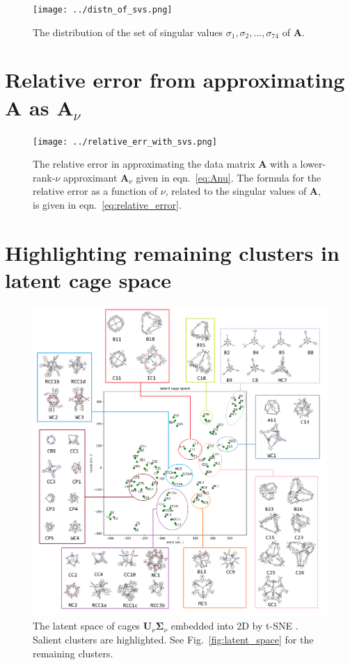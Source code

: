 \documentclass[journal=jacsat,manuscript=article]{achemso}
\begin{document}
\begin{figure}
\centering
	\texttt{[image: ../distn\_of\_svs.png]}
	\caption{The distribution of the set of singular values $\sigma_1,\sigma_2, ..., \sigma_{74}$ of $\mathbf{A}$.
	} \label{fig:distn_of_svs}
\end{figure}

\newpage
\clearpage

\section{Relative error from approximating $\mathbf{A}$ as $\mathbf{A}_\nu$}

\begin{figure}
\centering
	\texttt{[image: ../relative\_err\_with\_svs.png]}
	\caption{The relative error in approximating the data matrix $\mathbf{A}$ with a lower-rank-$\nu$ approximant $\mathbf{A}_\nu$ given in eqn.~\ref{eq:Anu}. The formula for the relative error as a function of $\nu$, related to the singular values of $\mathbf{A}$, is given in eqn.~\ref{eq:relative_error}.
	} \label{fig:relative_err_with_svs}
\end{figure}

\newpage
\clearpage

\section{Highlighting remaining clusters in latent cage space}

\begin{figure}[h!]
\centering
	\includegraphics[width=0.9\columnwidth]{../latent_cage_space_2D_marked_SI.png}
	\caption{The latent space of cages $\mathbf{U}_\nu \mathbf{\Sigma}_\nu$ embedded into 2D by t-SNE \cite{maaten2008visualizing,wattenberg2016how}. Salient clusters are highlighted. See Fig.~\ref{fig:latent_space} for the remaining clusters.
	} \label{fig:latent_space2}
\end{figure}
\end{document}
